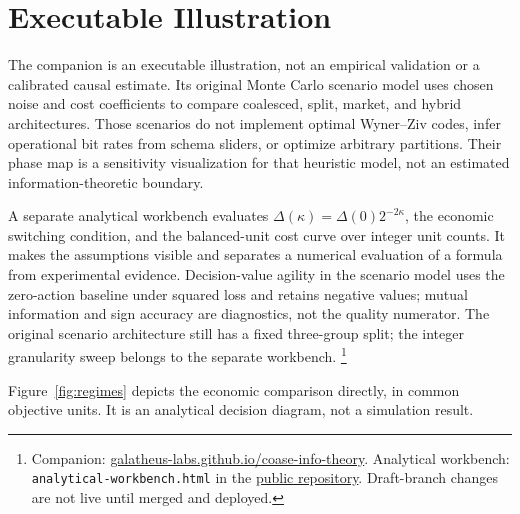 \documentclass[11pt]{article}
\begin{document}
\section{Executable Illustration}

The companion is an executable illustration, not an empirical validation or a
calibrated causal estimate. Its original Monte Carlo scenario model uses
chosen noise and cost coefficients to compare coalesced, split, market, and
hybrid architectures. Those scenarios do not implement optimal Wyner--Ziv
codes, infer operational bit rates from schema sliders, or optimize arbitrary
partitions. Their phase map is a sensitivity visualization for that heuristic
model, not an estimated information-theoretic boundary.

A separate analytical workbench evaluates
$\Delta(\kappa)=\Delta(0)2^{-2\kappa}$, the economic switching condition,
and the balanced-unit cost curve over integer unit counts. It makes the
assumptions visible and separates a numerical evaluation of a formula from
experimental evidence. Decision-value agility in the scenario model uses the
zero-action baseline under squared loss and retains negative values; mutual
information and sign accuracy are diagnostics, not the quality numerator.
The original scenario architecture still has a fixed three-group split; the
integer granularity sweep belongs to the separate workbench.
\footnote{Companion:
\href{https://galatheus-labs.github.io/coase-info-theory/}{galatheus-labs.github.io/coase-info-theory}.
Analytical workbench: \texttt{analytical-workbench.html} in the
\href{https://github.com/galatheus-labs/coase-info-theory}{public repository}.
Draft-branch changes are not live until merged and deployed.}

Figure~\ref{fig:regimes} depicts the economic comparison directly, in common
objective units. It is an analytical decision diagram, not a simulation result.
\end{document}
